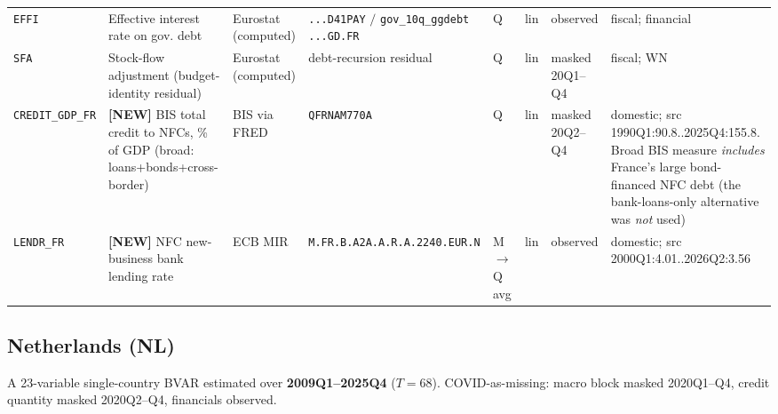 \begin{longtable}{@{}p{}p{}p{}p{}p{}p{}p{}p{}@{}}
\texttt{EFFI}       & Effective interest rate on gov. debt & Eurostat (computed) & \texttt{...D41PAY} $/$ \texttt{gov\_10q\_ggdebt ...\allowbreak GD.\allowbreak FR} & Q & lin & observed & fiscal; financial \\
\texttt{SFA}        & Stock-flow adjustment (budget-identity residual) & Eurostat (computed) & debt-recursion residual & Q & lin & masked 20Q1--Q4 & fiscal; WN \\
\texttt{CREDIT\_GDP\_FR} & \textbf{[NEW]} BIS total credit to NFCs, \% of GDP (broad: loans+bonds+cross-border) & BIS via FRED & \texttt{QFRNAM770A} & Q & lin & masked 20Q2--Q4 & domestic; src 1990Q1:90.8..\allowbreak 2025Q4:155.8. Broad BIS measure \emph{includes} France's large bond-financed NFC debt (the bank-loans-only alternative was \emph{not} used) \\
\texttt{LENDR\_FR}  & \textbf{[NEW]} NFC new-business bank lending rate & ECB MIR & \texttt{M.\allowbreak FR.\allowbreak B.\allowbreak A2A.\allowbreak A.\allowbreak R.\allowbreak A.2240.\allowbreak EUR.\allowbreak N} & M$\to$Q avg & lin & observed & domestic; src 2000Q1:4.01..\allowbreak 2026Q2:3.56 \\
\end{longtable}

\subsection{Netherlands (NL)}
\label{sec:data:NL}

A 23-variable single-country BVAR estimated over \textbf{2009Q1--2025Q4}
($T=68$). COVID-as-missing: macro block masked 2020Q1--Q4, credit quantity
masked 2020Q2--Q4, financials observed.

